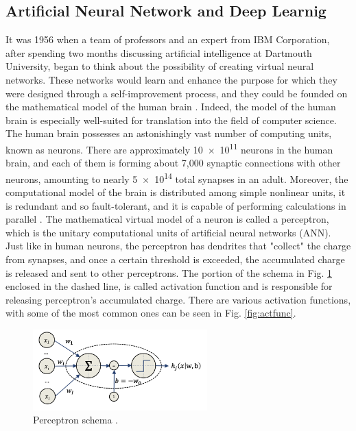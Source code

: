 \subsection{Artificial Neural Network and Deep Learnig}
\label{subsec:deepl}
It was 1956 when a team of professors and an expert from IBM Corporation, after spending two months discussing artificial intelligence at Dartmouth University, began to think about the possibility of creating virtual neural networks. These networks would learn and enhance the purpose for which they were designed through a self-improvement process, and they could be founded on the mathematical model of the human brain \cite{mccarthy_proposal_1955}. Indeed, the model of the human brain is especially well-suited for translation into the field of computer science. The human brain possesses an astonishingly vast number of computing units, known as neurons. There are approximately \num{10e11} neurons in the human brain, and each of them is forming about 7,000 synaptic connections with other neurons, amounting to nearly \num{5e14} total synapses in an adult. Moreover, the computational model of the brain is distributed among simple nonlinear units, it is redundant and so fault-tolerant, and it is capable of performing calculations in parallel \cite{matteo_matteucci_perceptrons_2021}. The mathematical virtual model of a neuron is called a perceptron, which is the unitary computational units of artificial neural networks (ANN). Just like in human neurons, the perceptron has dendrites that "collect" the charge from synapses, and once a certain threshold is exceeded, the accumulated charge is released and sent to other perceptrons. The portion of the schema in Fig. \ref{fig:perceptron} enclosed in the dashed line, is called activation function and is responsible for releasing perceptron's accumulated charge. There are various activation functions, with some of the most common ones can be seen in Fig. \ref{fig:actfunc}.
\begin{figure}
    \centering
    \includegraphics[width=0.6\textwidth]{Images/neurone.png}
    \caption[Perceptron schema]{Perceptron schema \cite{matteo_matteucci_perceptrons_2021}.}
    \label{fig:perceptron}
\end{figure}
